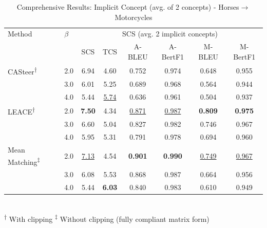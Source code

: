 \begin{table}[htbp]
\centering
\caption{Comprehensive Results: Implicit Concept (avg. of 2 concepts) - Horses$\to$Motorcycles}
\label{tab:implicitconcept_knight_s_riding_mammal_horsestomotorcycles_avg2}
\begin{tabular}{l|l|cccccc|}
\hline
Method & $\beta$ & \multicolumn{6}{c|}{SCS (avg. 2 implicit concepts)} \\
 &  & SCS & TCS & A-BLEU & A-BertF1 & M-BLEU & M-BertF1 \\
\hline
CASteer\textsuperscript{†} & 2.0 & 6.94 & 4.60 & 0.752 & 0.974 & 0.648 & 0.955 \\
 & 3.0 & 6.01 & 5.25 & 0.689 & 0.968 & 0.564 & 0.944 \\
 & 4.0 & 5.44 & \underline{5.74} & 0.636 & 0.961 & 0.504 & 0.937 \\
\hline
LEACE\textsuperscript{†} & 2.0 & \textbf{7.50} & 4.34 & \underline{0.871} & \underline{0.987} & \textbf{0.809} & \textbf{0.975} \\
 & 3.0 & 6.60 & 5.04 & 0.827 & 0.982 & 0.746 & 0.967 \\
 & 4.0 & 5.95 & 5.31 & 0.791 & 0.978 & 0.694 & 0.960 \\
\hline
Mean Matching\textsuperscript{‡} & 2.0 & \underline{7.13} & 4.54 & \textbf{0.901} & \textbf{0.990} & \underline{0.749} & \underline{0.967} \\
 & 3.0 & 6.08 & 5.53 & 0.868 & 0.987 & 0.664 & 0.956 \\
 & 4.0 & 5.44 & \textbf{6.03} & 0.840 & 0.983 & 0.610 & 0.949 \\
\hline
\end{tabular}
\\[0.5em]
\footnotesize
\textsuperscript{†} With clipping \quad \textsuperscript{‡} Without clipping (fully compliant matrix form)
\end{table}

